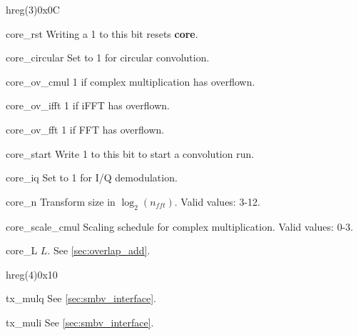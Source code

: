 \documentclass[12pt,a4paper,parskip=full,abstract=true,BCOR=12mm,twoside,open=right]{scrreprt}
\def\module#1{{\ttfamily\bfseries #1}}
\begin{document}
\begin{register}{h}{reg(3)}{0x0C}%
    \label{reg3}%
    \regnewline%
    \begin{regdesc}\begin{reglist}
        \item[core\_rst] Writing a 1 to this bit resets \module{core}.
        \item[core\_circular] Set to 1 for circular convolution.
        \item[core\_ov\_cmul] 1 if complex multiplication has overflown.
        \item[core\_ov\_ifft] 1 if iFFT has overflown.
        \item[core\_ov\_fft] 1 if FFT has overflown.
        \item[core\_start] Write 1 to this bit to start a convolution run.
        \item[core\_iq] Set to 1 for I/Q demodulation.
        \item[core\_n] Transform size in $\log_2(n_{fft})$. Valid values: 3-12.
        \item[core\_scale\_cmul] Scaling schedule for complex multiplication. Valid values: 0-3.
        \item[core\_L] $L$. See \cref{sec:overlap_add}.
    \end{reglist}\end{regdesc}
\end{register}
\begin{register}{h}{reg(4)}{0x10}%
    \label{reg4}%
    \regnewline%
    \begin{regdesc}\begin{reglist}[tx\_mulq]
        \item[tx\_mulq] See \cref{sec:smbv_interface}.
        \item[tx\_muli] See \cref{sec:smbv_interface}.
    \end{reglist}\end{regdesc}
\end{register}
\end{document}
